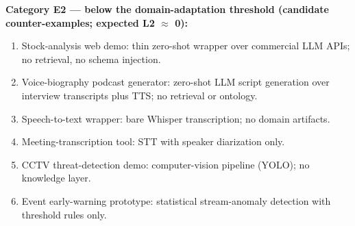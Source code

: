 \documentclass[10pt,a4paper]{article}
\begin{document}
\textbf{Category E2 --- below the domain-adaptation threshold (candidate counter-examples; expected L2 $\approx$ 0):}
\begin{enumerate}[leftmargin=*,itemsep=1pt,resume]
\item Stock-analysis web demo: thin zero-shot wrapper over commercial LLM APIs; no retrieval, no schema injection.
\item Voice-biography podcast generator: zero-shot LLM script generation over interview transcripts plus TTS; no retrieval or ontology.
\item Speech-to-text wrapper: bare Whisper transcription; no domain artifacts.
\item Meeting-transcription tool: STT with speaker diarization only.
\item CCTV threat-detection demo: computer-vision pipeline (YOLO); no knowledge layer.
\item Event early-warning prototype: statistical stream-anomaly detection with threshold rules only.
\end{enumerate}
\end{document}
